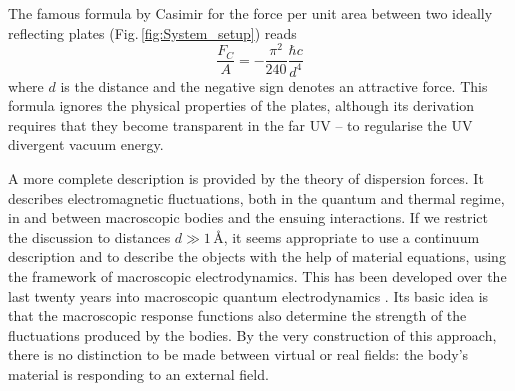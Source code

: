 \documentclass[11pt, oneside]{article}   	%
\begin{document}
The famous formula by Casimir for the force per unit area between two ideally
reflecting plates (Fig.\,\ref{fig:System_setup}) reads
\begin{equation}
\frac{ F_C }{ A } = - \frac{ \pi^2 }{ 240 } \frac{ \hbar c }{ d^4 }
\label{eq:Casimir-1948b}
\end{equation}
where $d$ is the distance and the negative sign denotes an attractive force.
This formula ignores the physical
properties of the plates, although its derivation requires that they become transparent
in the far UV -- to regularise the UV divergent vacuum energy.

A more complete description is provided by the theory of dispersion forces.
It describes electromagnetic fluctuations, 
both in the quantum
and thermal regime, in and between macroscopic bodies and the ensuing interactions.
If we restrict the discussion to distances $d \gg 1\,\text{\AA}$,
it seems appropriate to use a continuum description and to describe the objects with the
help of material equations, using the framework of macroscopic electrodynamics.
This has been developed over the last twenty years into macroscopic quantum electrodynamics
\citep{Rytov_vol3, Buhmann_BookI, Buhmann_BookII, Volokitin_2017book, Sernelius_2018book}. 
Its basic idea is that the macroscopic response functions
also determine the strength of the fluctuations produced by the bodies. 
By the very construction of this approach, there is
no distinction to be made between virtual or real fields: 
the body's material is responding to an external field. 
\end{document}
